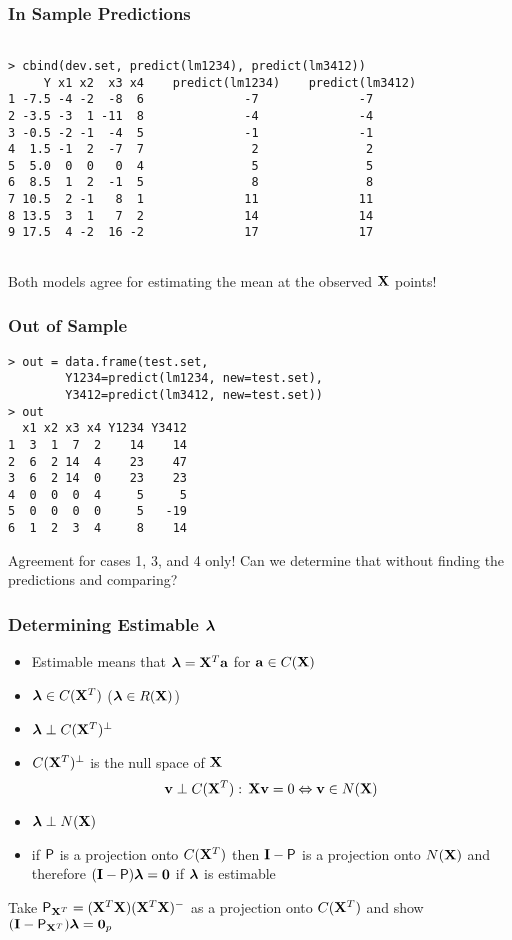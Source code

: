 \documentclass[handout]{beamer}
\begin{document}
\begin{frame}[fragile] \frametitle{In Sample Predictions}

\begin{verbatim}

> cbind(dev.set, predict(lm1234), predict(lm3412))
     Y x1 x2  x3 x4    predict(lm1234)    predict(lm3412)
1 -7.5 -4 -2  -8  6              -7              -7
2 -3.5 -3  1 -11  8              -4              -4
3 -0.5 -2 -1  -4  5              -1              -1
4  1.5 -1  2  -7  7               2               2
5  5.0  0  0   0  4               5               5
6  8.5  1  2  -1  5               8               8
7 10.5  2 -1   8  1              11              11
8 13.5  3  1   7  2              14              14
9 17.5  4 -2  16 -2              17              17
 
\end{verbatim}  
Both models agree for estimating the mean at the observed $\X$ points!
\end{frame}
\begin{frame} [fragile] \frametitle{Out of Sample}
\begin{verbatim}
> out = data.frame(test.set,
        Y1234=predict(lm1234, new=test.set), 
        Y3412=predict(lm3412, new=test.set))
> out
  x1 x2 x3 x4 Y1234 Y3412
1  3  1  7  2    14    14
2  6  2 14  4    23    47
3  6  2 14  0    23    23
4  0  0  0  4     5     5
5  0  0  0  0     5   -19
6  1  2  3  4     8    14
\end{verbatim}  \pause
Agreement for cases 1, 3, and 4 only!  Can we determine that without
finding the predictions and comparing?
\end{frame}

\begin{frame} \frametitle{Determining Estimable $\lambdab$}
  \begin{itemize}
 
 \item Estimable means that $\lambdab = \X^T \a$  for $\a \in C(\X)$ \pause
 \item $\lambdab \in C(\X^T)$ ($\lambdab \in R(\X)$)\pause
 \item $\lambdab \perp C(\X^T)^{\perp}$ \pause
 \item $C(\X^T)^{\perp}$ is the null space of $\X$  \pause
$$ \v \perp C(\X^T): \, \X \v = 0 \Leftrightarrow \v \in N(\X)$$ \pause
\item $\lambdab \perp  N(\X)$ \pause
\item if $\P$ is a projection onto $C(\X^T)$ then $\I - \P$ is a projection
  onto $N(\X)$ and therefore $(\I - \P) \lambdab = \zero$ if $\lambdab$
  is estimable \pause
  \end{itemize}
\vfill
Take $\P_{\X^T} = (\X^T\X)(\X^T\X)^{-}$ as a projection onto $C(\X^T)$
and show $(\I - \P_{\X^T})\lambdab = \zero_p$
\end{frame}
\end{document}
